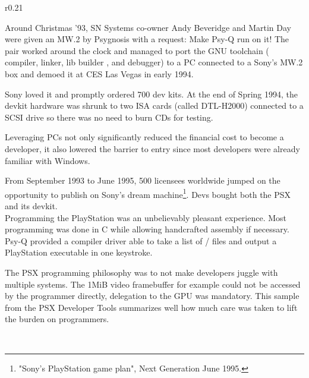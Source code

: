 \vspace{-10pt}
\begin{wrapfigure}[10]{r}{0.21\textwidth}{
\centering {}}
\end{wrapfigure}
Around Christmas '93, SN Systems co-owner Andy Beveridge and Martin Day were given an MW.2 by Psygnosis with a request: Make Psy-Q run on it! The pair worked around the clock and managed to port the GNU toolchain ( compiler,  linker, lib builder , and  debugger) to a PC connected to a Sony's MW.2 box and demoed it at CES Las Vegas in early 1994.\\
\par
 Sony loved it and promptly ordered 700 dev kits. At the end of Spring 1994, the devkit hardware was shrunk to two ISA cards (called DTL-H2000) connected to a SCSI drive so there was no need to burn CDs for testing.\\
\vspace{5pt}
\vspace{-10pt}
\par
Leveraging PCs not only significantly reduced the financial cost to become a developer, it also lowered the barrier to entry since most developers were already familiar with Windows.\\
\par
From September 1993 to June 1995, 500 licensees worldwide jumped on the opportunity to publish on Sony's dream machine\footnote{"Sony's PlayStation game plan", Next Generation June 1995.}. Devs bought both the PSX and its devkit.\\
Programming the PlayStation was an unbelievably pleasant experience. Most programming was done in C while allowing handcrafted assembly if necessary. Psy-Q provided a compiler driver able to take a list of / files and output a PlayStation executable in one keystroke.\\
\par
The PSX programming philosophy was to not make developers juggle with multiple systems. The 1MiB video framebuffer for example could not be accessed by the programmer directly, delegation to the GPU was mandatory. This sample from the PSX Developer Tools summarizes well how much care was taken to lift the burden on programmers.\\
\par
{}\\
\par
{}
\par









